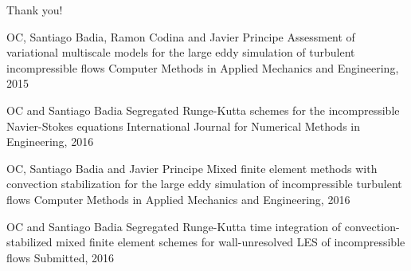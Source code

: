 \begin{frame}
\begin{figure}
\end{figure}
\vfill
\end{frame}
\begin{frame}
\vfill
\begin{center}
{\huge Thank you!}
\end{center}
\begin{thebibliography}{1}
{
\scriptsize
{}
OC, Santiago Badia, Ramon Codina and Javier Principe
\newblock Assessment of variational multiscale models for the large eddy simulation of turbulent incompressible flows
\newblock Computer Methods in Applied Mechanics and Engineering, 2015

OC and Santiago Badia
\newblock Segregated Runge-Kutta schemes for the incompressible Navier-Stokes equations 
\newblock International Journal for Numerical Methods in Engineering, 2016

OC, Santiago Badia and Javier Principe
\newblock Mixed finite element methods with convection stabilization for the large eddy simulation of incompressible turbulent flows
\newblock Computer Methods in Applied Mechanics and Engineering, 2016

OC and Santiago Badia
\newblock Segregated Runge-Kutta time integration of convection-stabilized mixed finite element  schemes for wall-unresolved LES of incompressible flows
\newblock Submitted, 2016
}
\end{thebibliography}
\vfill
\end{frame}